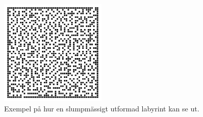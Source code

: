 
\begin{figure}[h]
	\begin{center}
		\includegraphics[width=0.45\textwidth]{../img/w09-lab/RandomMaze.jpg}
	\end{center}
	\caption{Exempel på hur en slumpmässigt utformad labyrint kan se ut.}
\end{figure}
